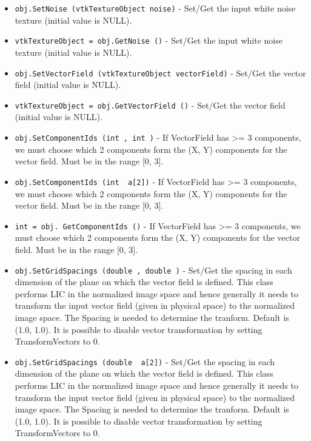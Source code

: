 \begin{itemize}
\item  \verb|obj.SetNoise (vtkTextureObject noise)| -  Set/Get the input white noise texture (initial value is NULL).

\item  \verb|vtkTextureObject = obj.GetNoise ()| -  Set/Get the input white noise texture (initial value is NULL).

\item  \verb|obj.SetVectorField (vtkTextureObject vectorField)| -  Set/Get the vector field (initial value is NULL).

\item  \verb|vtkTextureObject = obj.GetVectorField ()| -  Set/Get the vector field (initial value is NULL).

\item  \verb|obj.SetComponentIds (int , int )| -  If VectorField has >= 3 components, we must choose which 2 components 
 form the (X, Y) components for the vector field. Must be in the range 
 [0, 3].

\item  \verb|obj.SetComponentIds (int  a[2])| -  If VectorField has >= 3 components, we must choose which 2 components 
 form the (X, Y) components for the vector field. Must be in the range 
 [0, 3].

\item  \verb|int = obj. GetComponentIds ()| -  If VectorField has >= 3 components, we must choose which 2 components 
 form the (X, Y) components for the vector field. Must be in the range 
 [0, 3].

\item  \verb|obj.SetGridSpacings (double , double )| -  Set/Get the spacing in each dimension of the plane on which the vector 
 field is defined. This class performs LIC in the normalized image space
 and hence generally it needs to transform the input vector field (given 
 in physical space) to the normalized image space. The Spacing is needed
 to determine the tranform. Default is (1.0, 1.0). It is possible to 
 disable vector transformation by setting TransformVectors to 0.

\item  \verb|obj.SetGridSpacings (double  a[2])| -  Set/Get the spacing in each dimension of the plane on which the vector 
 field is defined. This class performs LIC in the normalized image space
 and hence generally it needs to transform the input vector field (given 
 in physical space) to the normalized image space. The Spacing is needed
 to determine the tranform. Default is (1.0, 1.0). It is possible to 
 disable vector transformation by setting TransformVectors to 0.


\end{itemize}
